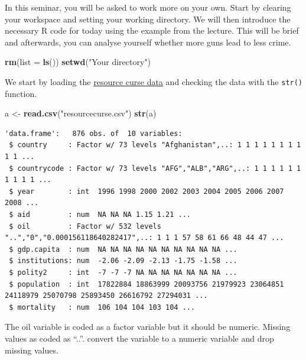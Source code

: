\documentclass[]{article}
\newenvironment{Shaded}{\begin{snugshade}}{\end{snugshade}}
\newcommand{\KeywordTok}[1]{\textcolor[rgb]{0.13,0.29,0.53}{\textbf{#1}}}
\newcommand{\DataTypeTok}[1]{\textcolor[rgb]{0.13,0.29,0.53}{#1}}
\newcommand{\StringTok}[1]{\textcolor[rgb]{0.31,0.60,0.02}{#1}}
\newcommand{\CommentTok}[1]{\textcolor[rgb]{0.56,0.35,0.01}{\textit{#1}}}
\newcommand{\OtherTok}[1]{\textcolor[rgb]{0.56,0.35,0.01}{#1}}
\newcommand{\OperatorTok}[1]{\textcolor[rgb]{0.81,0.36,0.00}{\textbf{#1}}}
\newcommand{\NormalTok}[1]{#1}
\theoremstyle{definition}
\theoremstyle{definition}
\theoremstyle{definition}
\theoremstyle{remark}
\begin{document}
In this seminar, you will be asked to work more on your own. Start by
clearing your workspace and setting your working directory. We will then
introduce the necessary R code for today using the example from the
lecture. This will be brief and afterwards, you can analyse yourself
whether more guns lead to less crime.

\begin{Shaded}
\begin{Highlighting}[]
\KeywordTok{rm}\NormalTok{(}\DataTypeTok{list =} \KeywordTok{ls}\NormalTok{())}
\KeywordTok{setwd}\NormalTok{(}\StringTok{"Your directory"}\NormalTok{)}
\end{Highlighting}
\end{Shaded}

We start by loading the
\href{https://github.com/philippbroniecki/statistics1/blob/master/data/resourcecurse.csv?raw=TRUE}{resource
curse data} and checking the data with the \texttt{str()} function.

\begin{Shaded}
\begin{Highlighting}[]
\NormalTok{a <-}\StringTok{ }\KeywordTok{read.csv}\NormalTok{(}\StringTok{"resourcecurse.csv"}\NormalTok{)}
\KeywordTok{str}\NormalTok{(a)}
\end{Highlighting}
\end{Shaded}

\begin{verbatim}
'data.frame':   876 obs. of  10 variables:
 $ country     : Factor w/ 73 levels "Afghanistan",..: 1 1 1 1 1 1 1 1 1 1 ...
 $ countrycode : Factor w/ 73 levels "AFG","ALB","ARG",..: 1 1 1 1 1 1 1 1 1 1 ...
 $ year        : int  1996 1998 2000 2002 2003 2004 2005 2006 2007 2008 ...
 $ aid         : num  NA NA NA 1.15 1.21 ...
 $ oil         : Factor w/ 532 levels "..","0","0.000156118640282417",..: 1 1 1 57 58 61 66 48 44 47 ...
 $ gdp.capita  : num  NA NA NA NA NA NA NA NA NA NA ...
 $ institutions: num  -2.06 -2.09 -2.13 -1.75 -1.58 ...
 $ polity2     : int  -7 -7 -7 NA NA NA NA NA NA NA ...
 $ population  : int  17822884 18863999 20093756 21979923 23064851 24118979 25070798 25893450 26616792 27294031 ...
 $ mortality   : num  106 104 104 103 104 ...
\end{verbatim}

The oil variable is coded as a factor variable but it should be numeric.
Missing values as coded as ``..''. convert the variable to a numeric
variable and drop missing values.

\begin{Shaded}
\end{Shaded}
\end{document}
